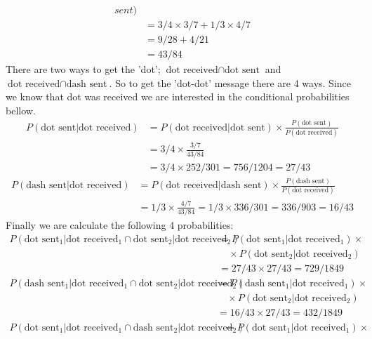 \documentclass[a4paper]{article}
\begin{document}
\begin{enumerate}
\begin{enumerate}
\begin{align}
{      sent})\nonumber\\
      &=3/4\times3/7+1/3\times4/7\nonumber\\
      &=9/28+4/21\nonumber\\
      &=43/84
      \end{align}
      There are two ways to get the 'dot'; $\text{dot received}\cap\text{dot
      sent}$ and $\text{dot received}\cap\text{dash sent}$. So to get the
      'dot-dot' message there are 4 ways. Since we know that dot was received
      we are interested in the conditional probabilities bellow.\\
      \begin{align}
      P(\text{dot sent}|\text{dot received})&=P(\text{dot received}|\text{dot
      sent})\times\frac{P(\text{dot sent})}{P(\text{dot received})}\nonumber\\
      &=3/4\times\frac{3/7}{43/84}\nonumber\\
      &=3/4\times252/301=756/1204=27/43
      \end{align}
      \begin{align}
      P(\text{dash sent}|\text{dot received})&=P(\text{dot
      received}|\text{dash sent})\times\frac{P(\text{dash sent})}{P(\text{dot
      received})}\nonumber\\
      &=1/3\times\frac{4/7}{43/84}=1/3\times336/301=336/903=16/43
      \end{align}
      Finally we are calculate the following 4 probabilities:
      \begin{align}
      P(\text{dot sent}_1|\text{dot received}_1\cap\text{dot sent}_2|\text{dot
      received}_2)&=P(\text{dot sent}_1|\text{dot received}_1)\times\nonumber\\
      &\quad\times P(\text{dot sent}_2|\text{dot received}_2)\nonumber\\
      &=27/43\times27/43=729/1849
      \end{align}
      \begin{align}
      P(\text{dash sent}_1|\text{dot received}_1\cap\text{dot sent}_2|\text{dot
      received}_2)&=P(\text{dash sent}_1|\text{dot received}_1)\times\nonumber\\
      &\quad\times P(\text{dot sent}_2|\text{dot received}_2)\nonumber\\
      &=16/43\times27/43=432/1849
      \end{align}
      \begin{align}
      P(\text{dot sent}_1|\text{dot received}_1\cap\text{dash sent}_2|\text{dot
      received}_2)&=P(\text{dot sent}_1|\text{dot received}_1)\times\nonumber\\

\end{align}
\end{enumerate}
\end{enumerate}
\end{document}

